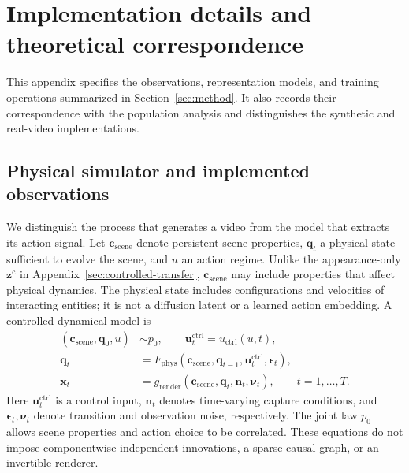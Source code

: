 \section{Implementation details and theoretical correspondence}
\label{sec:implementation-correspondence}
This appendix specifies the observations, representation models, and
training operations summarized in Section~\ref{sec:method}. It also
records their correspondence with the population analysis and distinguishes
the synthetic and real-video implementations.

\subsection{Physical simulator and implemented observations}
\label{subsec:implementation-process}

We distinguish the process that generates a video from the model that extracts
its action signal. Let $\mathbf c_{\mathrm{scene}}$ denote persistent scene properties,
$\mathbf q_t$ a physical state sufficient to evolve the scene, and $u$ an action regime.
Unlike the appearance-only $\mathbf z^{\mathrm c}$ in Appendix~\ref{sec:controlled-transfer},
$\mathbf c_{\mathrm{scene}}$ may include properties that affect physical dynamics.
The physical state includes configurations and velocities of interacting
entities; it is not a diffusion latent or a learned action embedding.
A controlled dynamical model is
\begin{align}
  (\mathbf c_{\mathrm{scene}},\mathbf q_0,u)&\sim p_0,\qquad
       \mathbf u_t^{\mathrm{ctrl}}=u_{\mathrm{ctrl}}(u,t), \label{eq:impl-context}\\
  \mathbf q_t&=F_{\mathrm{phys}}(\mathbf c_{\mathrm{scene}},\mathbf q_{t-1},\mathbf u_t^{\mathrm{ctrl}},\boldsymbol\epsilon_t),
       \label{eq:impl-action}\\
  \mathbf x_t&=g_{\mathrm{render}}(\mathbf c_{\mathrm{scene}},\mathbf q_t,\mathbf n_t,\boldsymbol\nu_t),
       \qquad t=1,\ldots,T. \label{eq:impl-observation}
\end{align}
Here $\mathbf u_t^{\mathrm{ctrl}}$ is a control input, $\mathbf n_t$ denotes time-varying capture conditions,
and $\boldsymbol\epsilon_t,\boldsymbol\nu_t$ denote transition and observation noise, respectively.
The joint law $p_0$ allows scene properties and action choice to be correlated.
These equations do not impose componentwise independent innovations,
a sparse causal graph, or an invertible renderer.


